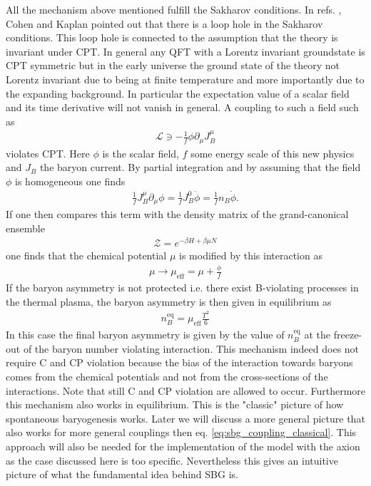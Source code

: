 \documentclass[13pt,a4paper,titlepage]{article}
\begin{document}
All the mechanism above mentioned fulfill the Sakharov conditions.
In refs. \cite{COHEN1987251}, \cite{COHEN1988913} Cohen and Kaplan pointed out that there is a loop hole in the Sakharov conditions.
This loop hole is connected to the assumption that the theory is invariant under CPT.
In general any QFT with a Lorentz invariant groundstate is CPT symmetric but in the early universe the ground state of the theory not Lorentz invariant due to being at finite temperature and more importantly
due to the expanding background. In particular the expectation value of a scalar field and its time derivative will not vanish in general. A coupling to such a field such as \cite[eq. 1.2]{COHEN1987251}
\begin{align}
    \label{eq:sbg_coupling_classical}
    \mathcal{L} \ni - \frac{1}{f} \phi \partial_\mu J^\mu_B
\end{align}
violates CPT. Here $\phi$ is the scalar field, $f$ some energy scale of this new physics and $J_B$ the baryon current.
By partial integration and by assuming that the field $\phi$ is homogeneous one finds \cite[1.3]{COHEN1987251}
\begin{align}
    \frac{1}{f} J_B^\mu \partial_\mu \phi = \frac{1}{f} J_B^0 \dot{\phi}
    = \frac{1}{f} n_B \dot{\phi}.
\end{align}
If one then compares this term with the density matrix of the grand-canonical ensemble
\begin{align}
    \mathcal{Z} = e^{-\beta H + \beta \mu N}
\end{align}
one finds that the chemical potential $\mu$ is modified by this
interaction as
\begin{align}
    \mu \to \mu_\mathrm{eff} = \mu + \frac{\phi}{f}
\end{align}
If the baryon asymmetry is not protected i.e. there exist B-violating processes in the thermal plasma, the baryon asymmetry is then given in equilibrium as \cite[eq. 3.58]{the_early_universe_kolb_and_turner}
\begin{align}
    n_B^\mathrm{eq} = \mu_\mathrm{eff} \frac{T^2}{6}
\end{align}
In this case the final baryon asymmetry is given by the value of $n^\mathrm{eq}_B$ at the freeze-out of the baryon number violating interaction.
This mechanism indeed does not require C and CP violation because the bias of the interaction towards baryons comes from the chemical potentials and not from the cross-sections of the interactions.
Note that still C and CP violation are allowed to occur.
Furthermore this mechanism also works in equilibrium.
This is the "classic" picture of how spontaneous baryogenesis works. Later we will discuss a more general picture
that also works for more general couplings then eq. \eqref{eq:sbg_coupling_classical}.
This approach will also be needed for the implementation of the model with the axion as the case discussed here is too
specific. Nevertheless this gives an intuitive picture of what the fundamental idea behind SBG is.
\end{document}
